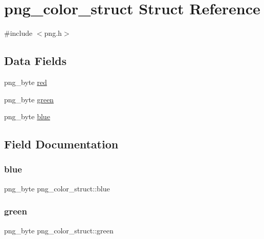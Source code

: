 \hypertarget{structpng__color__struct}{}\section{png\+\_\+color\+\_\+struct Struct Reference}
\label{structpng__color__struct}


{\ttfamily \#include $<$png.\+h$>$}

\subsection*{Data Fields}
\begin{DoxyCompactItemize}
\item 
png\+\_\+byte \hyperlink{structpng__color__struct_ad39dc2d7cb82e3670a3ad397bb4083cb}{red}
\item 
png\+\_\+byte \hyperlink{structpng__color__struct_ada9b5a911b185eaf7c6b87934e9f11ce}{green}
\item 
png\+\_\+byte \hyperlink{structpng__color__struct_a528e625b2778e787dc182e5df1164bbc}{blue}
\end{DoxyCompactItemize}


\subsection{Field Documentation}
\mbox{\label{structpng__color__struct_a528e625b2778e787dc182e5df1164bbc}} 
\subsubsection{\texorpdfstring{blue}{blue}}
{\footnotesize\ttfamily png\+\_\+byte png\+\_\+color\+\_\+struct\+::blue}

\mbox{\label{structpng__color__struct_ada9b5a911b185eaf7c6b87934e9f11ce}} 
\subsubsection{\texorpdfstring{green}{green}}
{\footnotesize\ttfamily png\+\_\+byte png\+\_\+color\+\_\+struct\+::green}

